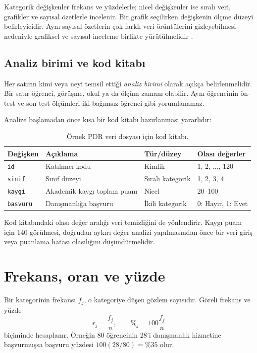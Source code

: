 Kategorik değişkenler frekans ve yüzdelerle; nicel değişkenler ise sıralı veri,
grafikler ve sayısal özetlerle incelenir. Bir grafik seçilirken değişkenin
ölçme düzeyi belirleyicidir. Aynı sayısal özetlerin çok farklı veri
örüntülerini gizleyebilmesi nedeniyle grafiksel ve sayısal inceleme birlikte
yürütülmelidir \cite{anscombe1973}.

\subsection{Analiz birimi ve kod kitabı}

Her satırın kimi veya neyi temsil ettiği \emph{analiz birimi} olarak açıkça
belirlenmelidir. Bir satır öğrenci, görüşme, okul ya da ölçüm zamanı olabilir.
Aynı öğrencinin ön-test ve son-test ölçümleri iki bağımsız öğrenci gibi
yorumlanamaz.

Analize başlamadan önce kısa bir kod kitabı hazırlanması yararlıdır:

\begin{table}[htbp]
\centering
\caption{Örnek PDR veri dosyası için kod kitabı.}
\begin{tabular}{@{}p{}p{}p{}p{}@{}}
\toprule
Değişken & Açıklama & Tür/düzey & Olası değerler \\
\midrule
\texttt{id} & Katılımcı kodu & Kimlik & 1, 2, $\ldots$, 120 \\
\texttt{sinif} & Sınıf düzeyi & Sıralı kategorik & 1, 2, 3, 4 \\
\texttt{kaygi} & Akademik kaygı toplam puanı & Nicel & 20--100 \\
\texttt{basvuru} & Danışmanlığa başvuru & İkili kategorik & 0: Hayır, 1: Evet \\
\bottomrule
\end{tabular}
\end{table}

Kod kitabındaki olası değer aralığı veri temizliğini de yönlendirir. Kaygı
puanı için 140 görülmesi, doğrudan aykırı değer analizi yapılmasından önce bir
veri giriş veya puanlama hatası olasılığını düşündürmelidir.

\section{Frekans, oran ve yüzde}

Bir kategorinin frekansı $f_j$, o kategoriye düşen gözlem sayısıdır. Göreli
frekans ve yüzde
\[
r_j=\frac{f_j}{n},\qquad \%_j=100\frac{f_j}{n}
\]
biçiminde hesaplanır. Örneğin 80 öğrencinin 28'i danışmanlık hizmetine
başvurmuşsa başvuru yüzdesi $100(28/80)=\%35$ olur.

